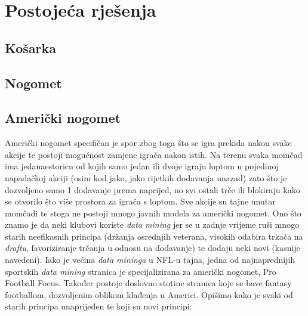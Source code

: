 \documentclass{ferseminar}
\begin{document}
\section{Postojeća rješenja}

\subsection{Košarka}

\subsection{Nogomet}

\subsection{Američki nogomet}
Američki nogomet specifičan je spor zbog toga što se igra prekida nakon svake akcije te postoji mogućnost zamjene igrača nakon istih. Na terenu svaka momčad ima jedanaestoricu od kojih samo jedan ili dvoje igraju loptom u pojedinoj napadačkoj akciji (osim kod jako, jako rijetkih dodavanja unazad) zato što je dozvoljeno samo 1 dodavanje prema naprijed, no svi ostali trče ili blokiraju kako se otvorilo što više prostora za igrača s loptom. Sve akcije su tajne unutar momčadi te stoga ne postoji mnogo javnih modela za američki nogomet. Ono što znamo je da neki klubovi koriste \textit{data mining} jer se u zadnje vrijeme ruši mnogo starih neefikasnih principa (držanja osrednjih veterana, visokih odabira trkača na \textit{draftu}, favoriziranje trčanja u odnosu na dodavanje) te dodaju neki novi (kasnije navedeni).
\newline
Iako je većina \textit{data mininga} u NFL-u tajna, jedna od najnaprednijih sportskih \textit{data mining} stranica je specijalizirana za američki nogomet, Pro Football Focus. Također postoje doslovno stotine stranica koje se bave fantasy footballom, dozvoljenim oblikom klađenja u Americi.
\newline
Opišimo kako je svaki od starih principa unaprijeđen te koji su novi principi:
\end{document}
